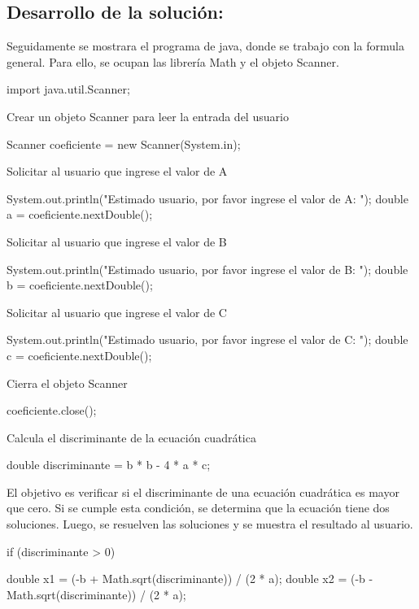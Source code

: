 \subsection{\textbf{Desarrollo de la solución:}}
Seguidamente se mostrara el programa de java, donde se trabajo con la formula general. Para ello, se ocupan las librería Math y el objeto Scanner.
\begin{javaCode}
    
import java.util.Scanner;

    
        Crear un objeto Scanner para leer la entrada del usuario
        \begin{javaCode}
        Scanner coeficiente = new Scanner(System.in);
        \end{javaCode}
        Solicitar al usuario que ingrese el valor de A
        \begin{javaCode}
        System.out.println("Estimado usuario, por favor ingrese el valor de A: ");
        double a = coeficiente.nextDouble();
        \end{javaCode}
        Solicitar al usuario que ingrese el valor de B
        \begin{javaCode}
        System.out.println("Estimado usuario, por favor ingrese el valor de B: ");
        double b = coeficiente.nextDouble();
        \end{javaCode}
        Solicitar al usuario que ingrese el valor de C
        \begin{javaCode}
        System.out.println("Estimado usuario, por favor ingrese el valor de C: ");
        double c = coeficiente.nextDouble();
        \end{javaCode}
        Cierra el objeto Scanner
        \begin{javaCode}
        coeficiente.close();
        \end{javaCode}
        Calcula el discriminante de la ecuación cuadrática
        \begin{javaCode}
        double discriminante = b * b - 4 * a * c;
        \end{javaCode}
       El objetivo es verificar si el discriminante de una ecuación cuadrática es mayor que cero. Si se cumple esta condición, se determina que la ecuación tiene dos soluciones. Luego, se resuelven las soluciones y se muestra el resultado al usuario.
        \begin{javaCode}
        if (discriminante > 0) {
            double x1 = (-b + Math.sqrt(discriminante)) / (2 * a);
            double x2 = (-b - Math.sqrt(discriminante)) / (2 * a);
       
}
\end{javaCode}
\end{javaCode}
